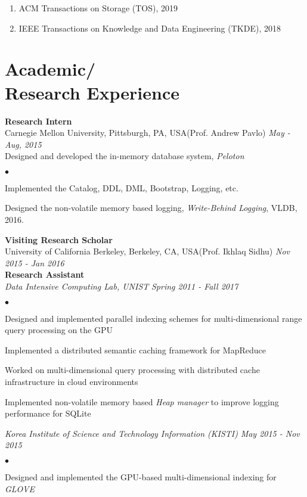 \documentclass[margin,line]{res}
\newenvironment{list2}{
  \begin{list}{$\bullet$}{%
      \setlength{\itemsep}{0in}
      \setlength{\parsep}{0in} \setlength{\parskip}{0in}
      \setlength{\topsep}{0in} \setlength{\partopsep}{0in}
      \setlength{\leftmargin}{0.2in}}}{\end{list}}
\begin{document}
\begin{resume}
\begin{enumerate}
\item ACM Transactions on Storage (TOS), 2019
\item IEEE Transactions on Knowledge and Data Engineering (TKDE), 2018

\end{enumerate}

\section{\sc Academic/\\Research Experience}

{\bf Research Intern}  \\
{Carnegie Mellon University, Pittsburgh, PA, USA(Prof. Andrew Pavlo)} \hfill {\it May - Aug, 2015}\\
Designed and developed the in-memory database system, {\it Peloton}
\begin{list2}
\item Implemented the Catalog, DDL, DML, Bootstrap, Logging, etc.
\item Designed the non-volatile memory based logging, {\it Write-Behind Logging}, VLDB, 2016.
\end{list2}

{\bf Visiting Research Scholar}  \\
{University of California Berkeley, Berkeley, CA, USA(Prof. Ikhlaq Sidhu)} \hfill {\it Nov 2015 - Jan 2016}\\

{\bf Research Assistant}  \\
{\it Data Intensive Computing Lab, UNIST} \hfill  {\it Spring 2011 - Fall 2017}\\
\begin{list2}
\item Designed and implemented parallel indexing schemes for multi-dimensional range query processing on the GPU 
\item Implemented a distributed semantic caching framework for MapReduce
\item Worked on multi-dimensional query processing with distributed cache infrastructure in cloud environments
\item Implemented non-volatile memory based {\it Heap manager} to improve logging performance for SQLite
\end{list2}

{\it Korea Institute of Science and Technology Information (KISTI) } \hfill  {\it May 2015 - Nov 2015}\\
\begin{list2}
\item Designed and implemented the GPU-based multi-dimensional indexing for {\it GLOVE}
\end{list2}


\end{resume}
\end{document}
